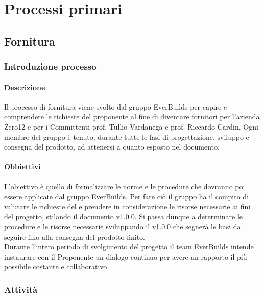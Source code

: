\section{Processi primari}
    \subsection{Fornitura}
        \subsubsection{Introduzione processo}
            \paragraph{Descrizione}
                Il processo di fornitura viene svolto dal gruppo EverBuilds per capire e comprendere le richieste del proponente al fine di diventare fornitori per l’azienda Zero12 e per i Committenti prof. Tullio Vardanega e prof. Riccardo Cardin. Ogni membro del gruppo è tenuto, durante tutte le fasi di progettazione, sviluppo e consegna del prodotto, ad attenersi a quanto esposto nel documento.\\
            \paragraph{Obbiettivi}
                L’obiettivo è quello di formalizzare le norme e le procedure che dovranno poi essere applicate dal gruppo EverBuilds. Per fare ciò il gruppo ha il compito di valutare le richieste del  e prendere in considerazione le risorse necessarie ai fini del progetto, stilando il documento  v1.0.0. Si passa dunque a determinare le procedure e le risorse necessarie sviluppando il  v1.0.0 che segnerà le basi da seguire fino alla consegna del prodotto finito.\\
                Durante l’intero periodo di svolgimento del progetto il team EverBuilds intende instaurare con il Proponente un dialogo continuo per avere un rapporto il più possibile costante e collaborativo.\\
        \subsubsection{Attività}
